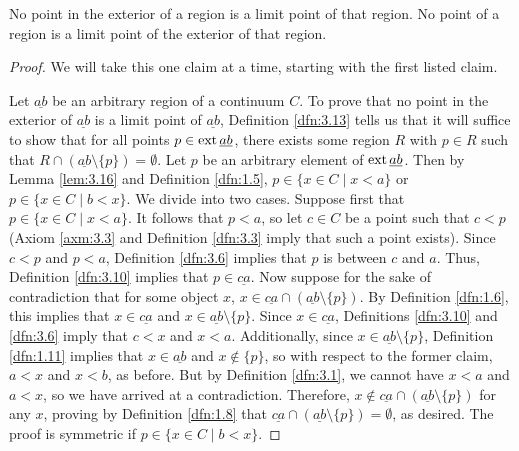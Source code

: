 \documentclass[../main.tex]{subfiles}
\begin{document}
\begin{lemma}\label{lem:3.17}
    No point in the exterior of a region is a limit point of that region. No point of a region is a limit point of the exterior of that region.
    \begin{proof}
        We will take this one claim at a time, starting with the first listed claim.\par
        Let $\underline{ab}$ be an arbitrary region of a continuum $C$. To prove that no point in the exterior of $\underline{ab}$ is a limit point of $\underline{ab}$, Definition \ref{dfn:3.13} tells us that it will suffice to show that for all points $p\in\operatorname{ext}\underline{ab}$, there exists some region $R$ with $p\in R$ such that $R\cap(\underline{ab}\setminus\{p\})=\emptyset$. Let $p$ be an arbitrary element of $\operatorname{ext}\underline{ab}$. Then by Lemma \ref{lem:3.16} and Definition \ref{dfn:1.5}, $p\in\{x\in C\mid x<a\}$ or $p\in\{x\in C\mid b<x\}$. We divide into two cases. Suppose first that $p\in\{x\in C\mid x<a\}$. It follows that $p<a$, so let $c\in C$ be a point such that $c<p$ (Axiom \ref{axm:3.3} and Definition \ref{dfn:3.3} imply that such a point exists). Since $c<p$ and $p<a$, Definition \ref{dfn:3.6} implies that $p$ is between $c$ and $a$. Thus, Definition \ref{dfn:3.10} implies that $p\in\underline{ca}$. Now suppose for the sake of contradiction that for some object $x$, $x\in\underline{ca}\cap(\underline{ab}\setminus\{p\})$. By Definition \ref{dfn:1.6}, this implies that $x\in\underline{ca}$ and $x\in\underline{ab}\setminus\{p\}$. Since $x\in\underline{ca}$, Definitions \ref{dfn:3.10} and \ref{dfn:3.6} imply that $c<x$ and $x<a$. Additionally, since $x\in\underline{ab}\setminus\{p\}$, Definition \ref{dfn:1.11} implies that $x\in\underline{ab}$ and $x\notin\{p\}$, so with respect to the former claim, $a<x$ and $x<b$, as before. But by Definition \ref{dfn:3.1}, we cannot have $x<a$ and $a<x$, so we have arrived at a contradiction. Therefore, $x\notin\underline{ca}\cap(\underline{ab}\setminus\{p\})$ for any $x$, proving by Definition \ref{dfn:1.8} that $\underline{ca}\cap(\underline{ab}\setminus\{p\})=\emptyset$, as desired. The proof is symmetric if $p\in\{x\in C\mid b<x\}$.\par

\end{proof}
\end{lemma}
\end{document}
